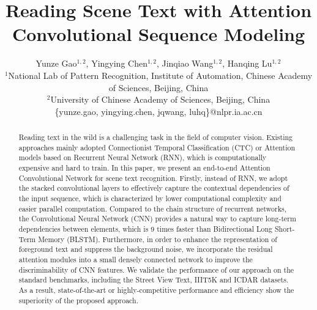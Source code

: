 \documentclass[letterpaper]{article} %
\begin{document}
\title{Reading Scene Text with Attention Convolutional Sequence Modeling}
\author{Yunze Gao$^{1,2}$, Yingying Chen$^{1,2}$, Jinqiao Wang$^{1,2}$, Hanqing Lu$^{1,2}$\\
$^{1}$National Lab of Pattern Recognition, Institute of Automation, Chinese Academy of Sciences, Beijing, China\\
$^{2}$University of Chinese Academy of Sciences, Beijing, China\\
\{yunze.gao, yingying.chen, jqwang, luhq\}@nlpr.ia.ac.cn\\
}
\nocopyright
\maketitle
\begin{abstract}
Reading text in the wild is a challenging task in the field of computer vision. Existing approaches mainly adopted Connectionist Temporal Classification (CTC) or Attention models based on Recurrent Neural Network (RNN), which is computationally expensive and hard to train. In this paper, we present an end-to-end Attention Convolutional Network for scene text recognition. Firstly, instead of RNN, we adopt the stacked convolutional layers to effectively capture the contextual dependencies of the input sequence, which is characterized by lower computational complexity and easier parallel computation. Compared to the chain structure of recurrent networks, the Convolutional Neural Network (CNN) provides a natural way to capture long-term dependencies between elements, which is 9 times faster than Bidirectional Long Short-Term Memory (BLSTM). Furthermore, in order to enhance the representation of foreground text and suppress the background noise, we incorporate the residual attention modules into a small densely connected network to improve the discriminability of CNN features. We validate the performance of our approach on the standard benchmarks, including the Street View Text, IIIT5K and ICDAR datasets. As a result, state-of-the-art or highly-competitive performance and efficiency show the superiority of the proposed approach.
\end{abstract}
\end{document}
